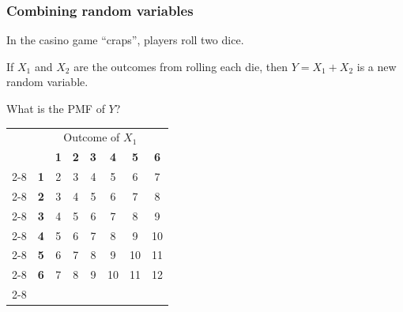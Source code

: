 \documentclass[t,8pt]{beamer}
\begin{document}
\begin{frame}
	\frametitle{Combining random variables}
	In the casino game ``craps'', players roll two dice. \par
	If $X_1$ and $X_2$ are the outcomes from rolling each die, then $Y=X_1+X_2$ is a new random variable. \par
	What is the PMF of $Y$? \par
	\begin{center}
		\renewcommand{\arraystretch}{1.5}
		\setlength{\tabcolsep}{10pt}
		\begin{tabular}{c c|c|c|c|c|c|c|}
			~ & \multicolumn{7}{c}{Outcome of $X_1$} \\
			&        & \textbf{1} & \textbf{2} & \textbf{3} & \textbf{4} & \textbf{5} & \textbf{6} \\
			\cline{2-8}
			\multirow{6}{*}{\rotatebox[origin=c]{90}{\parbox[c]{2cm}{\centering Outcome of $X_2$}}}
			& \textbf{1} & \cellcolor[HTML]{FFC7C7}2  & \cellcolor[HTML]{FFDDC7}3 & \cellcolor[HTML]{FFEFC7}4 & \cellcolor[HTML]{F7FFC7}5 & \cellcolor[HTML]{D2FFC7}6 & \cellcolor[HTML]{C7FFF2}7 \\
			\cline{2-8}
			& \textbf{2} & \cellcolor[HTML]{FFDDC7}3  & \cellcolor[HTML]{FFEFC7}4 & \cellcolor[HTML]{F7FFC7}5 & \cellcolor[HTML]{D2FFC7}6 & \cellcolor[HTML]{C7FFF2}7 & \cellcolor[HTML]{C7E7FF}8 \\
			\cline{2-8}
			& \textbf{3} & \cellcolor[HTML]{FFEFC7}4  & \cellcolor[HTML]{F7FFC7}5 & \cellcolor[HTML]{D2FFC7}6 & \cellcolor[HTML]{C7FFF2}7 & \cellcolor[HTML]{C7E7FF}8 & \cellcolor[HTML]{C7C7FF}9 \\
			\cline{2-8}
			& \textbf{4} & \cellcolor[HTML]{F7FFC7}5  & \cellcolor[HTML]{D2FFC7}6 & \cellcolor[HTML]{C7FFF2}7 & \cellcolor[HTML]{C7E7FF}8 & \cellcolor[HTML]{C7C7FF}9 & \cellcolor[HTML]{E7C7FF}10 \\
			\cline{2-8}
			& \textbf{5} & \cellcolor[HTML]{D2FFC7}6  & \cellcolor[HTML]{C7FFF2}7 & \cellcolor[HTML]{C7E7FF}8 & \cellcolor[HTML]{C7C7FF}9 & \cellcolor[HTML]{E7C7FF}10 & \cellcolor[HTML]{FFC7FF}11 \\
			\cline{2-8}
			& \textbf{6} & \cellcolor[HTML]{C7FFF2}7  & \cellcolor[HTML]{C7E7FF}8 & \cellcolor[HTML]{C7C7FF}9 & \cellcolor[HTML]{E7C7FF}10 & \cellcolor[HTML]{FFC7FF}11 & \cellcolor[HTML]{FFC7C7}12 \\
			\cline{2-8}
		\end{tabular}
	\end{center}
\end{frame}
\end{document}
